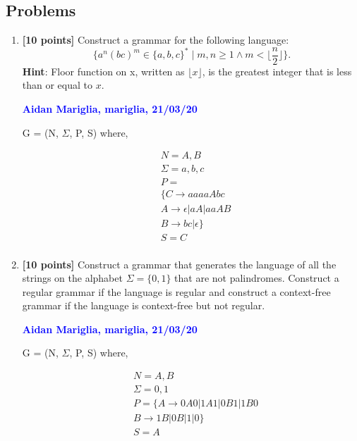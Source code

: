\documentclass[11pt,fleqn]{article}
\newcommand{\be}{\begin{enumerate}}
\newcommand{\ee}{\end{enumerate}}
\begin{document}
\newpage

\subsection*{Problems}

\be

  \item \textbf{[10 points]} Construct a grammar for the following
    language: $$\Big\{a^n(bc)^m \in \{a,b,c\}^* \mid m,n \ge 1 \wedge
    m < \lfloor\frac{n}{2}\rfloor\Big\}.$$
	\textbf{Hint}: Floor function on x, written as $\lfloor x\rfloor$, is the greatest integer that is less than or equal to $x$.
	

  \bigskip

  \textcolor{blue}{\textbf{Aidan Mariglia, mariglia, 21/03/20}}
  
  G = (N, $\Sigma$, P, S) where,

  \begin{align*}
      & N = A, B\\
      & \Sigma = a, b, c\\
      & P = \\
      & \{C \rightarrow aaaaAbc\\ 
      &  A \rightarrow \epsilon | aA | aaAB\\
      &  B \rightarrow bc|\epsilon \}\\
      &  S = C \\
  \end{align*}
  

  \bigskip

  \item \textbf{[10 points]} Construct a grammar that generates the
    language of all the strings on the alphabet $\Sigma = \{0,1\}$
    that are not palindromes.  Construct a regular grammar if the
    language is regular and construct a context-free grammar if the
    language is context-free but not regular.
  


  \bigskip

  \textcolor{blue}{\textbf{Aidan Mariglia, mariglia, 21/03/20}}

  
  G = (N, $\Sigma$, P, S) where,

  \begin{align*}
      & N = A, B\\
      & \Sigma = 0, 1\\
      & P = \{A \rightarrow 0A0|1A1|0B1|1B0  \\
      & B \rightarrow 1B|0B|1|0 \} \\
      &  S = A \\
  \end{align*}
  



\ee
\end{document}
